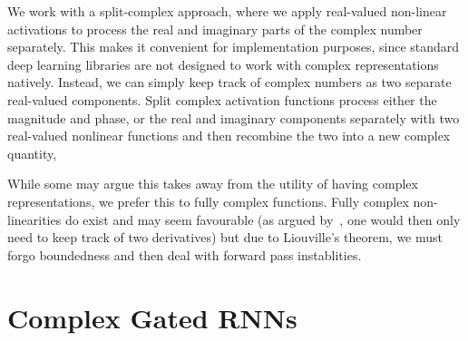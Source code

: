 \documentclass{article}
\begin{document}
We work with a split-complex approach, where we apply real-valued non-linear activations to process the real and imaginary parts of the complex number separately. This makes it convenient for implementation purposes, since standard deep learning libraries are not designed to work with complex representations natively. Instead, we can simply keep track of complex numbers as two separate real-valued components. Split complex activation functions process either the magnitude and phase, or the real and imaginary components separately with two real-valued nonlinear functions and then recombine the two into a new complex quantity,  %

While some may argue this takes away from the utility of having complex representations, we prefer this to fully complex functions. Fully complex non-linearities do exist and may seem favourable (as argued by~\cite{Trabelsi}, one would then only need to keep track of two derivatives) but due to Liouville's theorem, we must forgo boundedness and then deal with forward pass instablities.  


\section{Complex Gated RNNs}
\end{document}
